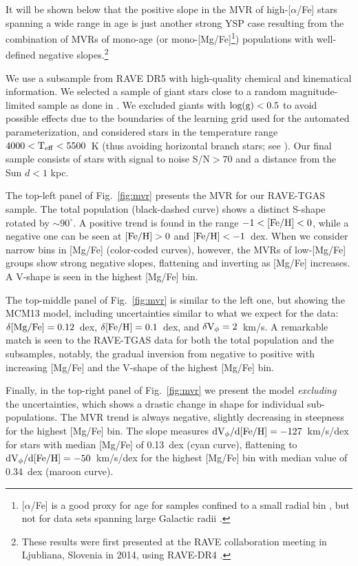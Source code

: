 \documentclass[usenatbib]{mnras}
\begin{document}
It will be shown below that the positive slope in the MVR of high-[$\alpha$/Fe] stars spanning a wide range in age is just another strong YSP case resulting from the combination of MVRs of mono-age (or mono-[Mg/Fe]\footnote{[$\alpha$/Fe] is a good proxy for age for samples confined to a small radial bin \citep{haywood13, bergemann14}, but not for data sets spanning large Galactic radii \citep{minchev17}.}) populations with well-defined negative slopes.\footnote{These results were first presented at the RAVE collaboration meeting in Ljubliana, Slovenia in 2014, using RAVE-DR4 \citep{kordopatis13b}.}

We use a subsample from RAVE DR5 \citep{kunder17} with high-quality chemical and kinematical information. We selected a sample of giant stars close to a random magnitude-limited sample as done in \cite{minchev14}. We excluded giants with $\rm log(g) < 0.5$ to avoid  possible effects due to the boundaries of the learning grid used for the automated parameterization, and considered stars in the temperature range $\rm 4000 < T_{eff} < 5500$~K (thus avoiding horizontal branch stars; see \citealt{boeche13a}). Our final sample consists of stars with signal to noise S/N$>70$ and a distance from the Sun $d<1$ kpc.

The top-left panel of Fig.~\ref{fig:mvr} presents the MVR for our RAVE-TGAS sample. The total population (black-dashed curve) shows a distinct S-shape rotated by $\sim90^\circ$. A positive trend is found in the range ${\rm-1<[Fe/H]<0}$, while a negative one can be seen at ${\rm[Fe/H]>0}$ and ${\rm[Fe/H]<-1}$~dex. When we consider narrow bins in [Mg/Fe] (color-coded curves), however, the MVRs of low-[Mg/Fe] groups show strong negative slopes, flattening and inverting as [Mg/Fe] increases. A V-shape is seen in the highest [Mg/Fe] bin. 

The top-middle panel of Fig.~\ref{fig:mvr} is similar to the left one, but showing the MCM13 model, including uncertainties similar to what we expect for the data: $\rm\delta[Mg/Fe]=0.12$~dex, $\rm\delta[Fe/H]=0.1$~dex, and $\rm\delta V_\phi=2$~km/s. A remarkable match is seen to the RAVE-TGAS data for both the total population and the subsamples, notably, the gradual inversion from negative to positive with increasing [Mg/Fe] and the V-shape of the highest [Mg/Fe] bin.

Finally, in the top-right panel of Fig.~\ref{fig:mvr} we present the model {\it excluding} the uncertainties, which shows a drastic change in shape for individual sub-populations. The MVR trend is always negative, slightly decreasing in steepness for the highest [Mg/Fe] bin. The slope measures $\rm dV_\phi/d[Fe/H]=-127$~km/s/dex for stars with median [Mg/Fe] of 0.13~dex (cyan curve), flattening to $\rm dV_\phi/d[Fe/H]=-50$~km/s/dex for the highest [Mg/Fe] bin with median value of 0.34~dex (maroon curve).
\end{document}
